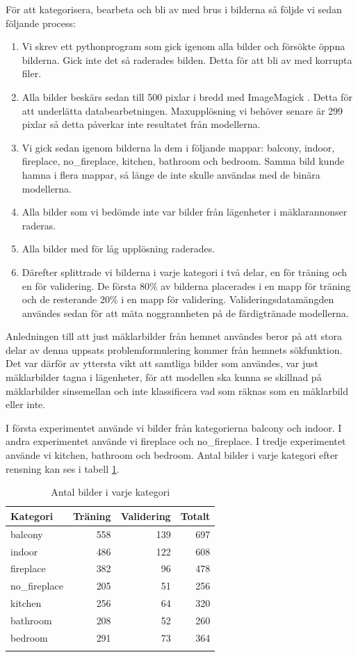 \documentclass[]{kththesis}
\begin{document}
För att kategorisera, bearbeta och bli av med brus i bilderna så följde vi sedan följande process:
\begin{enumerate}
  \item Vi skrev ett pythonprogram som gick igenom alla bilder och försökte öppna bilderna. Gick inte det så raderades bilden. Detta för att bli av med korrupta filer.
  \item Alla bilder beskärs sedan till 500 pixlar i bredd med ImageMagick \parencite{imagemagick}. Detta för att underlätta databearbetningen. Maxupplösning vi behöver senare är 299 pixlar så detta påverkar inte resultatet från modellerna.
  \item Vi gick sedan igenom bilderna la dem i följande mappar: balcony, indoor, fireplace, no\_fireplace, kitchen, bathroom och bedroom. Samma bild kunde hamna i flera mappar, så länge de inte skulle användas med de binära modellerna.
  \item Alla bilder som vi bedömde inte var bilder från lägenheter i mäklarannonser raderas.
  \item Alla bilder med för låg upplösning raderades.
  \item Därefter splittrade vi bilderna i varje kategori i två delar, en för träning och en för validering. De första 80\% av bilderna placerades i en mapp för träning och de resterande 20\% i en mapp för validering. Valideringsdatamängden användes sedan för att mäta noggrannheten på de färdigtränade modellerna.
\end{enumerate}


Anledningen till att just mäklarbilder från hemnet användes beror på att stora delar av denna uppsats problemformulering kommer från hemnets sökfunktion. Det var därför av yttersta vikt att samtliga bilder som användes, var just mäklarbilder tagna i lägenheter, för att modellen ska kunna se skillnad på mäklarbilder sinsemellan och inte klassificera vad som räknas som en mäklarbild eller inte.

I första experimentet använde vi bilder från kategorierna balcony och indoor. I andra experimentet använde vi fireplace och no\_fireplace. I tredje experimentet använde vi kitchen, bathroom och bedroom. Antal bilder i varje kategori efter rensning kan ses i tabell \ref{table:amount_images}.
\begin{table}
  \caption{Antal bilder i varje kategori}
  \centering
  \begin{tabular}{ lrrr }
  Kategori & Träning & Validering & Totalt \\  
  \hline
  balcony       & 558 & 139 & 697 \\ 
  indoor        & 486 & 122 & 608 \\ 
  fireplace     & 382 &  96 & 478 \\ 
  no\_fireplace & 205 &  51 & 256 \\
  kitchen       & 256 &  64 & 320 \\
  bathroom      & 208 &  52 & 260 \\ 
  bedroom       & 291 &  73 & 364 \\ 
  \hline
  \label{table:amount_images}
  \end{tabular}
\end{table}
\end{document}
